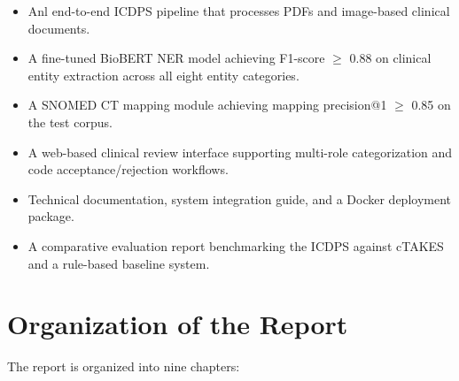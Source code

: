 \begin{itemize}

\item Anl end-to-end ICDPS pipeline that processes PDFs and image-based clinical documents.

\item A fine-tuned BioBERT NER model achieving F1-score $\geq$ 0.88 on clinical entity extraction across all eight entity categories.

\item A SNOMED CT mapping module achieving mapping precision@1 $\geq$ 0.85 on the test corpus.

\item A web-based clinical review interface supporting multi-role categorization and code acceptance/rejection workflows.

\item Technical documentation, system integration guide, and a Docker deployment package.

\item A comparative evaluation report benchmarking the ICDPS against cTAKES and a rule-based baseline system.

\end{itemize}


\section{Organization of the Report}

The report is organized into nine chapters:

